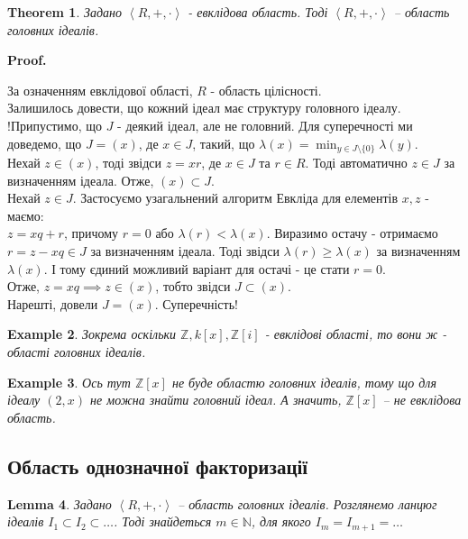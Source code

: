 \documentclass[a4paper, 10pt]{article}
\makeatletter
\theoremstyle{theoremdd}
\newtheorem{theorem}{Theorem}[subsection]
\theoremstyle{theoremdd}
\theoremstyle{theoremdd}
\theoremstyle{theoremdd}
\theoremstyle{theoremdd}
\newtheorem{example}[theorem]{Example}
\theoremstyle{theoremdd}
\theoremstyle{theoremdd}
\theoremstyle{theoremdd}
\theoremstyle{theoremdd}
\theoremstyle{theoremdd}
\theoremstyle{theoremdd}
\theoremstyle{theoremdd}
\theoremstyle{theoremdd}
\newtheorem{lemma}[theorem]{Lemma}
\theoremstyle{theoremdd}
\theoremstyle{theoremdd}
\renewenvironment{proof}[1][Proof.\\]{\par
\pushQED{\hfill \qed}%
\normalfont \topsep6\p@\@plus6\p@\relax
\trivlist
\item\relax
{\bfseries
#1\@addpunct{.}}\hspace\labelsep\ignorespaces
}{%
\popQED\endtrivlist\@endpefalse
}
\makeatother
\begin{document}
\begin{theorem}
Задано $\left<R,+,\cdot\right>$ - евклідова область. Тоді $\left<R,+,\cdot\right>$ -- область головних ідеалів.
\end{theorem}

\begin{proof}
За означенням евклідової області, $R$ - область цілісності.\\
Залишилось довести, що кожний ідеал має структуру головного ідеалу.\\
!Припустимо, що $J$ - деякий ідеал, але не головний. Для суперечності ми доведемо, що $J = (x)$, де $x \in J$, такий, що $\lambda(x) = \displaystyle\min_{y \in J \setminus \{0\}} \lambda(y)$.\\
Нехай $z \in (x)$, тоді звідси $z = xr$, де $x \in J$ та $r \in R$. Тоді автоматично $z \in J$ за визначенням ідеала. Отже, $(x) \subset J$.\\
Нехай $z \in J$. Застосуємо узагальнений алгоритм Евкліда для елементів $x,z$ - маємо:\\
$z = xq + r$, причому $r = 0$ або $\lambda(r) < \lambda(x)$. Виразимо остачу - отримаємо\\
$r = z - xq \in J$ за визначенням ідеала. Тоді звідси $\lambda(r) \geq \lambda(x)$ за визначенням $\lambda(x)$. І тому єдиний можливий варіант для остачі - це стати $r = 0$.\\
Отже, $z = xq \implies z \in (x)$, тобто звідси $J \subset (x)$.\\
Нарешті, довели $J = (x)$. Суперечність!
\end{proof}

\begin{example}
Зокрема оскільки $\mathbb{Z}, k[x], \mathbb{Z}[i]$ - евклідові області, то вони ж - області головних ідеалів.
\end{example}

\begin{example}
Ось тут $\mathbb{Z}[x]$ не буде областю головних ідеалів, тому що для ідеалу $(2,x)$ не можна знайти головний ідеал. А значить, $\mathbb{Z}[x]$ -- не евклідова область.
\end{example}

\subsection{Область однозначної факторизації}
\begin{lemma}
Задано $\left< R,+,\cdot\right>$ -- область головних ідеалів. Розглянемо ланцюг ідеалів $I_1 \subset I_2 \subset \dots$. Тоді знайдеться $m \in \mathbb{N}$, для якого $I_m = I_{m+1} = \dots$
\end{lemma}
\end{document}
